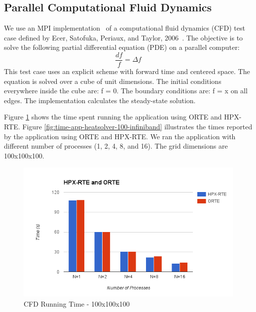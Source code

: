 \subsection{Parallel Computational Fluid Dynamics}
We use an MPI implementation~\cite{resch1999comparison} of a computational fluid dynamics (CFD) test case defined by Ecer, Satofuka, Periaux, and Taylor, 2006~\cite{ecer1996parallel}.
The objective is to solve the following partial differential equation (PDE) on a parallel computer:
\[
\frac{df}{f} = \Delta f
\]
This test case uses an explicit scheme with forward time and centered space. The equation is solved over a cube of unit dimensions. The initial conditions everywhere inside the cube are: f = 0. The boundary conditions are: f = x on all edges. The implementation calculates the steady-state solution.

Figure \ref{fig:time-all-heatsolver-100-infiniband} shows the time spent running the application using ORTE and HPX-RTE. Figure \ref{fig:time-app-heatsolver-100-infiniband} illustrates the times reported by the application using ORTE and HPX-RTE. We ran the application with different number of processes (1, 2, 4, 8, and 16). The grid dimensions are 100x100x100.

\begin{figure}[h!]
  \centering
  \includegraphics[scale=0.7]{images/time-all-heatsolver-100-infiniband.png}
  \caption[CFD Running Time - 100x100x100]{CFD Running Time - 100x100x100}
  \label{fig:time-all-heatsolver-100-infiniband}
\end{figure}

